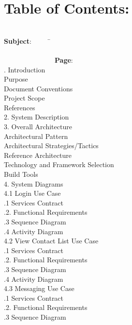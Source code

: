 \documentclass[29pt,a4paper]{moderncv}
\begin{document}
\section{\textbf{Table of Contents:}}
\begin{tabbing}
\\\textbf{Subject}: ~~~~~\= ~~~~~~~~~~~~~~~~~~~~~~~~~~~~~~~~~~~~~~~~~~~~~~~~~~~~~~~~~~~~~~~~~~~~~~~~~~~~~~~~~~~~~~~\= \textbf{Page}:
\\. Introduction \> \\							
 Purpose 	\\							
 Document Conventions 					\\
 Project Scope 							\\
 References 							\\
2. System Description \> 					\\
3. Overall Architecture \> 				\\
 Architectural Pattern  				\\
 Architectural Strategies/Tactics 					\\
 Reference Architecture 			\\
 Technology and Framework Selection  		\\
 Build Tools 							\\
4. System Diagrams \> \\
4.1 Login Use Case \> \\
.1 Services Contract \\
.2. Functional Requirements \\
.3 Sequence Diagram \\
.4 Activity Diagram \\
4.2 View Contact List Use Case \> \\
.1 Services Contract \\
.2. Functional Requirements \\
.3 Sequence Diagram \\
.4 Activity Diagram \\
4.3 Messaging Use Case \> \\
.1 Services Contract \\
.2. Functional Requirements \\
.3 Sequence Diagram \\

\end{tabbing}
\end{document}
